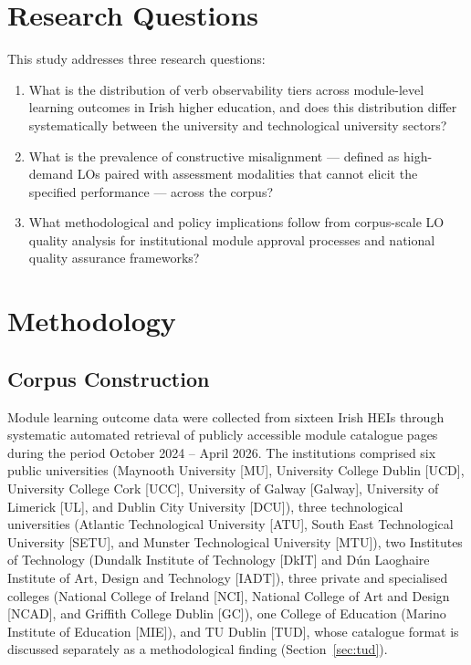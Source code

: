 \documentclass[12pt, a4paper]{article}
\begin{document}
\section{Research Questions}
\label{sec:rq}

This study addresses three research questions:

\begin{enumerate}[label=\textbf{RQ\arabic*}]
  \item What is the distribution of verb observability tiers across module-level
        learning outcomes in Irish higher education, and does this distribution
        differ systematically between the university and technological university
        sectors?

  \item What is the prevalence of constructive misalignment --- defined as
        high-demand LOs paired with assessment modalities that cannot elicit
        the specified performance --- across the corpus?

  \item What methodological and policy implications follow from corpus-scale
        LO quality analysis for institutional module approval processes and
        national quality assurance frameworks?
\end{enumerate}

\section{Methodology}
\label{sec:methods}

\subsection{Corpus Construction}

Module learning outcome data were collected from sixteen Irish HEIs through systematic
automated retrieval of publicly accessible module catalogue pages during the period
October 2024 -- April 2026. The institutions comprised six public universities
(Maynooth University [MU], University College Dublin [UCD], University College Cork
[UCC], University of Galway [Galway], University of Limerick [UL], and Dublin City
University [DCU]), three technological universities (Atlantic Technological
University [ATU], South East Technological University [SETU], and Munster
Technological University [MTU]), two Institutes of Technology (Dundalk Institute of
Technology [DkIT] and Dún Laoghaire Institute of Art, Design and Technology [IADT]),
three private and specialised colleges (National College of Ireland [NCI], National
College of Art and Design [NCAD], and Griffith College Dublin [GC]), one College of Education (Marino Institute of
Education [MIE]), and TU Dublin [TUD], whose catalogue format is discussed separately
as a methodological finding (Section~\ref{sec:tud}).
\end{document}
